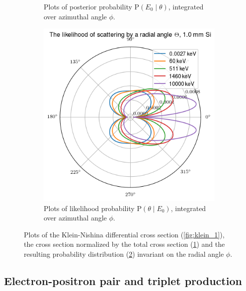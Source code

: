 \documentclass[a4paper,12pt,titlepage, twoside]{article}
\begin{document}
\begin{figure}[ht]
\begin{subfigure}{0.32\textwidth}
    \caption{Plots of posterior probability $\mathrm{P}\left(E_0 \mid \theta\right)$, integrated over azimuthal angle $\phi$.}
    \label{fig:klein_2}
  \end{subfigure}
  \begin{subfigure}{0.32\textwidth}
    \includegraphics[width=1.0\textwidth]{./fig/klein_nishina_3.png}
    \caption{Plots of likelihood probability $\mathrm{P}\left(\theta \mid E_0\right)$, integrated over azimuthal angle $\phi$.}
    \label{fig:klein_3}
  \end{subfigure}
  \caption{Plots of the Klein-Nishina differential cross section (\ref{fig:klein_1}), the cross section normalized by the total cross section (\ref{fig:klein_2}) and the resulting probability distribution (\ref{fig:klein_3}) invariant on the radial angle $\phi$.}
  \label{fig:klein_nishina}
\end{figure}



\subsection{Electron-positron pair and triplet production}


\end{document}
